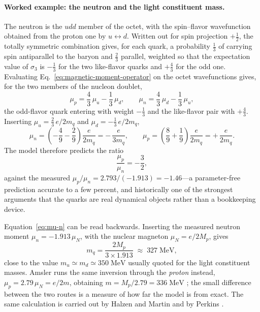 \paragraph{Worked example: the neutron and the light constituent mass.}
The neutron is the $udd$ member of the octet, with the spin--flavor wavefunction obtained
from the proton one by $u \leftrightarrow d$. Written out for spin projection
$+\tfrac{1}{2}$, the totally symmetric combination gives, for each quark, a probability
$\tfrac{1}{3}$ of carrying spin antiparallel to the baryon and $\tfrac{2}{3}$ parallel,
weighted so that the expectation value of $\sigma_3$ is $-\tfrac{1}{3}$ for the two
like-flavor quarks and $+\tfrac{4}{3}$ for the odd one. Evaluating
Eq.~\eqref{eq:magnetic-moment-operator} on the octet wavefunctions gives, for the two
members of the nucleon doublet,
\begin{equation}
    \mu_p = \frac{4}{3}\,\mu_u - \frac{1}{3}\,\mu_d ,
    \qquad
    \mu_n = \frac{4}{3}\,\mu_d - \frac{1}{3}\,\mu_u ,
    \label{eq:mu-n-setup}
\end{equation}
the odd-flavor quark entering with weight $-\tfrac13$ and the like-flavor pair with
$+\tfrac43$. Inserting $\mu_u = \tfrac{2}{3}\,e/2m_q$ and $\mu_d = -\tfrac{1}{3}\,e/2m_q$,
\begin{equation}
    \mu_n = \left(-\frac{4}{9} - \frac{2}{9}\right)\frac{e}{2m_q}
          = -\,\frac{e}{3 m_q},
    \qquad
    \mu_p = \left(\frac{8}{9} + \frac{1}{9}\right)\frac{e}{2m_q}
          = +\,\frac{e}{2 m_q}.
    \label{eq:mu-n}
\end{equation}
The model therefore
predicts the ratio
\begin{equation}
    \frac{\mu_p}{\mu_n} = -\frac{3}{2},
    \label{eq:mu-ratio}
\end{equation}
against the measured $\mu_p/\mu_n = 2.793/(-1.913) = -1.46$---a parameter-free prediction accurate to a few percent, and
historically one of the strongest arguments that the quarks are real dynamical objects
rather than a bookkeeping device.

Equation~\eqref{eq:mu-n} can be read backwards. Inserting the measured neutron moment
$\mu_n = -1.913\,\mu_N$, with the nuclear magneton $\mu_N = e/2M_p$, gives
\begin{equation}
    m_q = \frac{2 M_p}{3 \times 1.913} \;\approx\; 327\;\mathrm{MeV},
    \label{eq:mq-from-mun}
\end{equation}
close to the value $m_u \simeq m_d \simeq 350\;\mathrm{MeV}$ usually quoted for the light
constituent masses. Amsler runs the same inversion through the \emph{proton} instead,
$\mu_p = 2.79\,\mu_N = e/2m$, obtaining $m = M_p/2.79 = 336\;\mathrm{MeV}$
\cite[Ch.~14]{Amsler2018}; the small difference between the two routes is a measure of how
far the model is from exact. The same calculation is carried out by Halzen and Martin
\cite[Ch.~2]{HalzenMartin1984} and by Perkins \cite[Ch.~4]{Perkins2000}.

